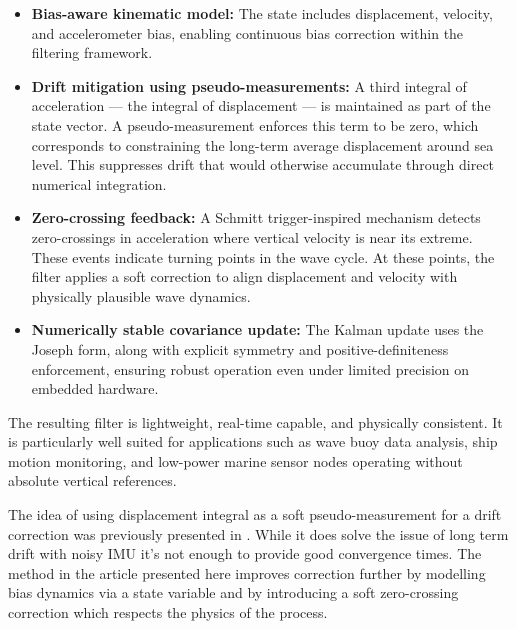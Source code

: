 \documentclass[11pt,letterpaper]{article}
\begin{document}
\begin{itemize}
    \item \textbf{Bias-aware kinematic model:} The state includes displacement, velocity, and accelerometer bias, enabling continuous bias correction within the filtering framework.
    
    \item \textbf{Drift mitigation using pseudo-measurements:} A third integral of acceleration --- the integral of displacement --- is maintained as part of the state vector. A pseudo-measurement enforces this term to be zero, which corresponds to constraining the long-term average displacement around sea level. This suppresses drift that would otherwise accumulate through direct numerical integration.
    
    \item \textbf{Zero-crossing feedback:} A Schmitt trigger-inspired mechanism detects zero-crossings in acceleration where vertical velocity is near its extreme. These events indicate turning points in the wave cycle. At these points, the filter applies a soft correction to align displacement and velocity with physically plausible wave dynamics.
    
    \item \textbf{Numerically stable covariance update:} The Kalman update uses the Joseph form, along with explicit symmetry and positive-definiteness enforcement, ensuring robust operation even under limited precision on embedded hardware.
\end{itemize}

The resulting filter is lightweight, real-time capable, and physically consistent. It is particularly well suited for applications such as wave buoy data analysis, ship motion monitoring, and low-power marine sensor nodes operating without absolute vertical references.

The idea of using displacement integral as a soft pseudo-measurement for a drift correction was previously presented in \cite{Sharkh2014}. While it does solve the issue of long term drift with noisy IMU it's not enough to provide good convergence times. The method in the article presented here improves correction further by modelling bias dynamics via a state variable and by introducing
a soft zero-crossing correction which respects the physics of the process.
\end{document}
